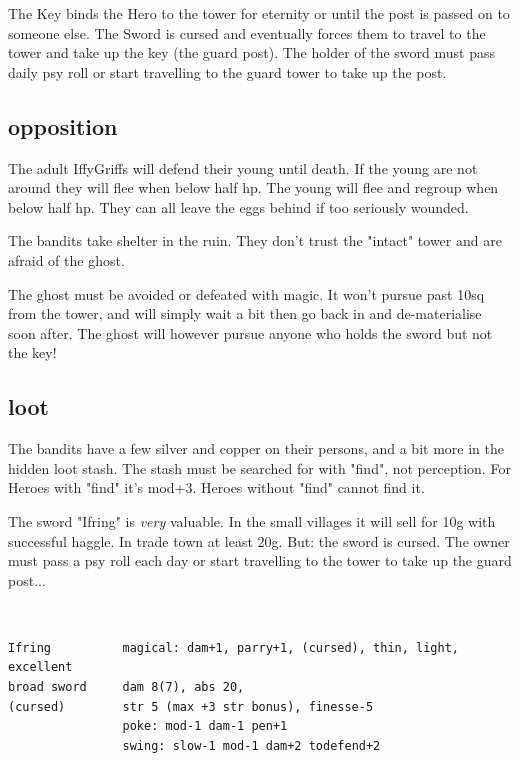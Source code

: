 The Key binds the Hero to the tower for eternity or until the post is passed on to someone else. The Sword is cursed and eventually forces them to travel to the tower and take up the key (the guard post). The holder of the sword must pass daily psy roll or start travelling to the guard tower to take up the post.


\subsection*{opposition}

The adult IffyGriffs will defend their young until death. If the young are not around they will flee when below half hp. The young will flee and regroup when below half hp. They can all leave the eggs behind if too seriously wounded.

The bandits take shelter in the ruin. They don't trust the "intact" tower and are afraid of the ghost.

The ghost must be avoided or defeated with magic. It won't pursue past 10sq from the tower, and will simply wait a bit then go back in and de-materialise soon after. The ghost will however pursue anyone who holds the sword but not the key!


\subsection*{loot}

The bandits have a few silver and copper on their persons, and a bit more in the hidden loot stash. The stash must be searched for with "find", not perception. For Heroes with "find" it's mod+3. Heroes without "find" cannot find it.

The sword "Ifring" is \emph{very} valuable. In the small villages it will sell for 10g with successful haggle. In trade town at least 20g. But: the sword is cursed. The owner must pass a psy roll each day or start travelling to the tower to take up the guard post...

\

\goodbreak 
\small \begin{samepage} \begin{verbatim}
Ifring          magical: dam+1, parry+1, (cursed), thin, light, excellent
broad sword     dam 8(7), abs 20,
(cursed)        str 5 (max +3 str bonus), finesse-5
                poke: mod-1 dam-1 pen+1
                swing: slow-1 mod-1 dam+2 todefend+2
\end{verbatim} \end{samepage} \normalsize










